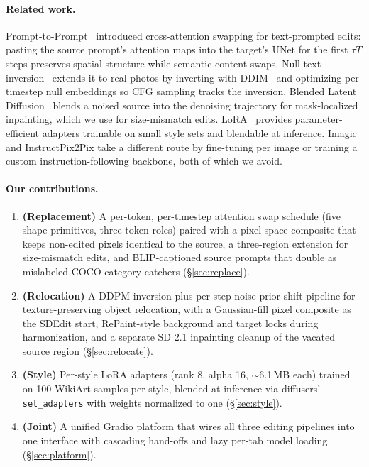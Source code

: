 \documentclass[10pt,twocolumn,letterpaper]{article}
\begin{document}
\paragraph{Related work.}
Prompt-to-Prompt~\cite{hertz2022p2p} introduced cross-attention swapping for text-prompted edits: pasting the source prompt's attention maps into the target's UNet for the first $\tau T$ steps preserves spatial structure while semantic content swaps. Null-text inversion~\cite{mokady2022nullinv} extends it to real photos by inverting with DDIM~\cite{song2021ddim} and optimizing per-timestep null embeddings so CFG sampling tracks the inversion. Blended Latent Diffusion~\cite{avrahami2022blended} blends a noised source into the denoising trajectory for mask-localized inpainting, which we use for size-mismatch edits. LoRA~\cite{hu2021lora} provides parameter-efficient adapters trainable on small style sets and blendable at inference. Imagic and InstructPix2Pix take a different route by fine-tuning per image or training a custom instruction-following backbone, both of which we avoid.

\paragraph{Our contributions.}
\begin{enumerate}
    \itemsep0em
    \item \textbf{(Replacement)} A per-token, per-timestep attention swap schedule (five shape primitives, three token roles) paired with a pixel-space composite that keeps non-edited pixels identical to the source, a three-region extension for size-mismatch edits, and BLIP-captioned source prompts that double as mislabeled-COCO-category catchers (\S\ref{sec:replace}).
    \item \textbf{(Relocation)} A DDPM-inversion plus per-step noise-prior shift pipeline for texture-preserving object relocation, with a Gaussian-fill pixel composite as the SDEdit start, RePaint-style background and target locks during harmonization, and a separate SD 2.1 inpainting cleanup of the vacated source region (\S\ref{sec:relocate}).
    \item \textbf{(Style)} Per-style LoRA adapters (rank 8, alpha 16, $\sim$6.1\,MB each) trained on 100 WikiArt samples per style, blended at inference via diffusers' \texttt{set\_adapters} with weights normalized to one (\S\ref{sec:style}).
    \item \textbf{(Joint)} A unified Gradio platform that wires all three editing pipelines into one interface with cascading hand-offs and lazy per-tab model loading (\S\ref{sec:platform}).
\end{enumerate}
\end{document}
